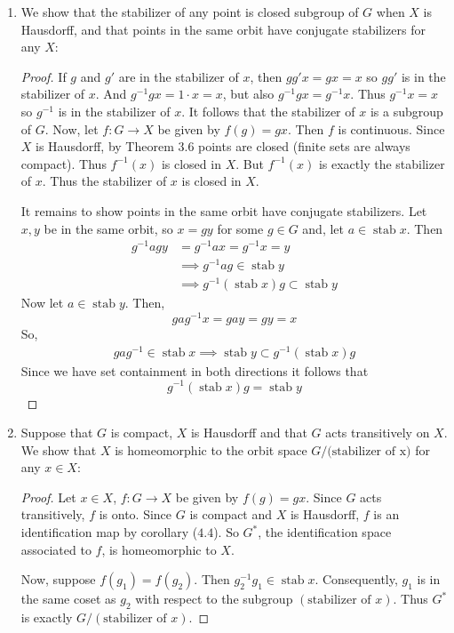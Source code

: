\documentclass{book}
\DeclareMathOperator*{\Stab}{\text{stab}}
\begin{document}
\begin{enumerate}[(1)]
    \item We show that the stabilizer of any point is closed subgroup of $G$ when $X$ is Hausdorff, and that points in the same orbit have conjugate stabilizers for any $X$: 
        \begin{proof} If $g$ and $g'$ are in the stabilizer of $x$, then $gg'x=gx=x$ so $gg'$ is in the stabilizer of $x$.  And $g^{-1}gx=1\cdot x=x$, but also $g^{-1}gx=g^{-1}x$.  Thus $g^{-1}x=x$ so $g^{-1}$ is in the stabilizer of $x$.  It follows that the stabilizer of $x$ is a subgroup of $G$.
            Now, let $f:G\rightarrow X$ be given by $f(g)=gx$.  Then $f$ is continuous.  Since $X$ is Hausdorff, by Theorem 3.6 points are closed (finite sets are always compact).  Thus $f^{-1}(x)$ is closed in $X$.  But $f^{-1}(x)$ is exactly the stabilizer of $x$.  Thus the stabilizer of $x$ is closed in $X$.
            \par  It remains to show points in the same orbit have conjugate stabilizers.  Let $x,y$ be in the same orbit, so $x=gy$ for some $g\in G$ and, let $a\in \Stab x$.  Then
            \begin{align*}
                g^{-1}agy & =g^{-1}ax=g^{-1}x=y \\    
                & \implies g^{-1}ag\in \Stab y \\
                & \implies g^{-1} (\Stab x)g \subset \Stab y
            \end{align*}
            Now let $a \in \Stab y$.  Then, 
            \[ gag^{-1}x=gay=gy=x\] 
            So,
            \begin{align*}
                gag^{-1}\in \Stab x \implies \Stab y \subset g^{-1} (\Stab x)g
            \end{align*}
            Since we have set containment in both directions it follows that 
            \[g^{-1} (\Stab x)g= \Stab y\]
        \end{proof}

    \item Suppose that $G$ is compact, $X$ is Hausdorff and that $G$ acts transitively on $X$. We show that $X$ is homeomorphic to the orbit space $G/\text{(stabilizer of x)}$ for any $x \in X$: 
        \begin{proof} Let $x\in X$, $f:G\rightarrow X$ be given by $f(g)=gx$. Since $G$ acts transitively, $f$ is onto.  Since $G$ is compact and $X$ is Hausdorff, $f$ is an identification map by corollary ($4.4$).  So $G^*$, the identification space associated to $f$, is homeomorphic to $X$.  
            \par Now, suppose $f(g_1)=f(g_2)$.  Then $g_2^{-1}g_1 \in \Stab x$.  Consequently, $g_1$ is in the same coset as $g_2$ with respect to the subgroup $(\text{stabilizer of }x)$. Thus $G^*$ is exactly $G/(\text{stabilizer of }x)$.
        \end{proof}


\end{enumerate}
\end{document}
